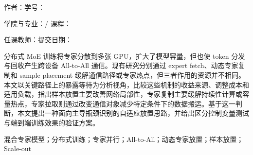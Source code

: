 \documentclass[10.5pt,compsoc,UTF8]{CjC}
\begin{document}
\setcounter{page}{1}

\begin{center}
{\heiti \PaperTitleCN\par}
\vspace{3mm}
{\fangsong 作者：\AuthorName\quad 学号：\StudentNumber\par}
\vspace{1mm}
{ 学院与专业：\DepartmentName / \MajorName\quad 课程：\CourseName\par}
{ 任课教师：\InstructorName\quad 提交日期：\SubmissionDate\par}
\end{center}
\vspace{1mm}
\noindent\hspace*{\CjCAbstractSideIndent}\begin{minipage}{\dimexpr\textwidth-2\CjCAbstractSideIndent\relax}
{\setlength{\baselineskip}{13.5pt}\selectfont
{}
分布式 MoE 训练将专家分散到多张 GPU，扩大了模型容量，但也使 token 分发与回收产生跨设备 All-to-All 通信。现有研究分别通过 expert fetch、动态专家复制和 sample placement 缓解通信路径或专家热点，但三者作用的资源并不相同。本文以关键路径上的暴露等待为分析视角，比较这些机制的收益来源、调整成本和适用负载，指出样本放置主要改善网络局部性，专家复制主要缓解持续性计算或容量热点，专家拉取则通过改变通信对象减少特定条件下的数据搬运。基于这一判断，本文提出一种面向主导瓶颈识别的自适应放置思路，并给出区分控制变量测试与端到端训练效果的验证方案。\par
\vspace{1mm}
混合专家模型；分布式训练；专家并行；All-to-All；动态专家放置；样本放置；Scale-out\par}
\end{minipage}

\vspace{\CjCAbstractAfterSkip}








\end{document}
